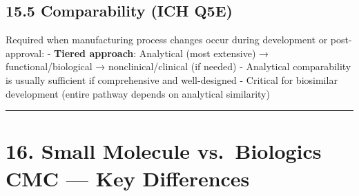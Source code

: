 \documentclass[
  11pt,
  a4paper,
]{report}
\begin{document}
\hypertarget{comparability-ich-q5e}{%
\subsection{15.5 Comparability (ICH Q5E)}\label{comparability-ich-q5e}}

Required when manufacturing process changes occur during development or
post-approval: - \textbf{Tiered approach}: Analytical (most extensive) →
functional/biological → nonclinical/clinical (if needed) - Analytical
comparability is usually sufficient if comprehensive and well-designed -
Critical for biosimilar development (entire pathway depends on
analytical similarity)

\begin{center}\rule{0.5\linewidth}{0.5pt}\end{center}

\hypertarget{small-molecule-vs.-biologics-cmc-key-differences}{%
\section{16. Small Molecule vs.~Biologics CMC --- Key
Differences}\label{small-molecule-vs.-biologics-cmc-key-differences}}
\end{document}
